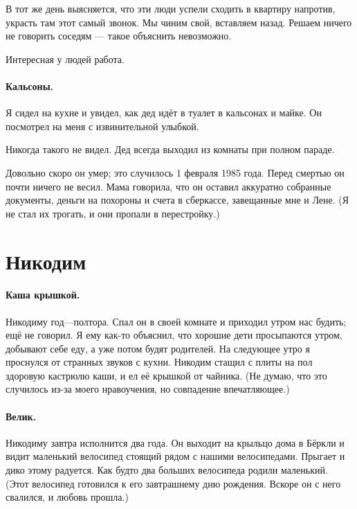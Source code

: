 \documentclass{book}
\begin{document}
В тот же день выясняется, что эти люди успели сходить в квартиру напротив, украсть там этот самый звонок.
Мы чиним свой, вставляем назад.
Решаем ничего не говорить соседям --- такое объяснить невозможно.

Интересная у людей работа.

\paragraph{Кальсоны.}
Я сидел на кухне и увидел, как дед идёт в туалет в кальсонах и майке.
Он посмотрел на меня с извинительной улыбкой.

Никогда такого не видел.
Дед всегда выходил из комнаты при полном параде.

Довольно скоро он умер; это случилось 1 февраля 1985 года. 
Перед смертью он почти ничего не весил.
Мама говорила, что он оставил аккуратно собранные документы, деньги на похороны и  счета в сберкассе, завещанные мне и Лене.
(Я не стал их трогать, и они пропали в перестройку.)



\section*{Никодим}

\paragraph{Каша крышкой.}
Никодиму год---полтора.
Спал он в своей комнате и приходил утром нас будить; ещё не говорил.
Я ему как-то объяснил, что хорошие дети просыпаются утром, добывают себе еду, а уже потом будят родителей.
На следующее утро я проснулся от странных звуков с кухни.
Никодим стащил с плиты на пол здоровую кастрюлю каши, и ел её крышкой от чайника.
(Не думаю, что это случилось из-за моего нравоучения, но совпадение впечатляющее.)

\paragraph{Велик.}
Никодиму завтра исполнится два года.
Он выходит на крыльцо дома в Бёркли и видит маленький велосипед стоящий рядом с нашими велосипедами. Прыгает и дико этому радуется.
Как будто два больших велосипеда родили маленький.
(Этот велосипед готовился к его завтрашнему дню рождения. Вскоре он с него свалился, и любовь прошла.)
\end{document}
